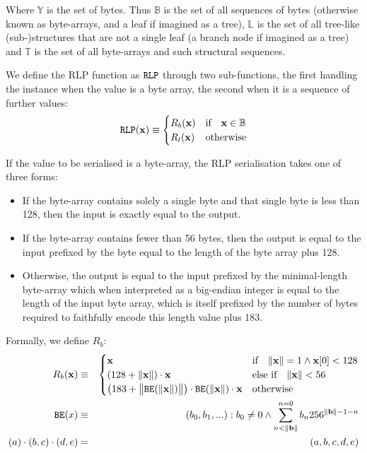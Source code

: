 \documentclass[9pt,oneside]{amsart}
\begin{document}
Where $\mathbb{Y}$ is the set of bytes. Thus $\mathbb{B}$ is the set of all sequences of bytes (otherwise known as byte-arrays, and a leaf if imagined as a tree), $\mathbb{L}$ is the set of all tree-like (sub-)structures that are not a single leaf (a branch node if imagined as a tree) and $\mathbb{T}$ is the set of all byte-arrays and such structural sequences.

We define the RLP function as $\mathtt{\tiny RLP}$ through two sub-functions, the first handling the instance when the value is a byte array, the second when it is a sequence of further values:
\begin{equation}
\mathtt{\tiny RLP}(\mathbf{x}) \equiv \begin{cases} R_b(\mathbf{x}) & \text{if} \quad \mathbf{x} \in \mathbb{B} \\ R_l(\mathbf{x}) & \text{otherwise} \end{cases}
\end{equation}

If the value to be serialised is a byte-array, the RLP serialisation takes one of three forms:

\begin{itemize}
\item If the byte-array contains solely a single byte and that single byte is less than 128, then the input is exactly equal to the output.
\item If the byte-array contains fewer than 56 bytes, then the output is equal to the input prefixed by the byte equal to the length of the byte array plus 128.
\item Otherwise, the output is equal to the input prefixed by the minimal-length byte-array which when interpreted as a big-endian integer is equal to the length of the input byte array, which is itself prefixed by the number of bytes required to faithfully encode this length value plus 183.
\end{itemize}

Formally, we define $R_b$:
\begin{eqnarray}
R_b(\mathbf{x}) & \equiv & \begin{cases}
\mathbf{x} & \text{if} \quad \lVert \mathbf{x} \rVert = 1 \wedge \mathbf{x}[0] < 128 \\
(128 + \lVert \mathbf{x} \rVert) \cdot \mathbf{x} & \text{else if} \quad \lVert \mathbf{x} \rVert < 56 \\
\big(183 + \big\lVert \mathtt{\tiny BE}(\lVert \mathbf{x} \rVert) \big\rVert \big) \cdot \mathtt{\tiny BE}(\lVert \mathbf{x} \rVert) \cdot \mathbf{x} & \text{otherwise}
\end{cases} \\
\mathtt{\tiny BE}(x) & \equiv & (b_0, b_1, ...): b_0 \neq 0 \wedge \sum^{n = 0}_{n < \lVert \mathbf{b} \rVert} b_n256^{\lVert \mathbf{b} \rVert - 1 - n} \\
(a) \cdot (b, c) \cdot (d, e) & = & (a, b, c, d, e)
\end{eqnarray}
\end{document}
